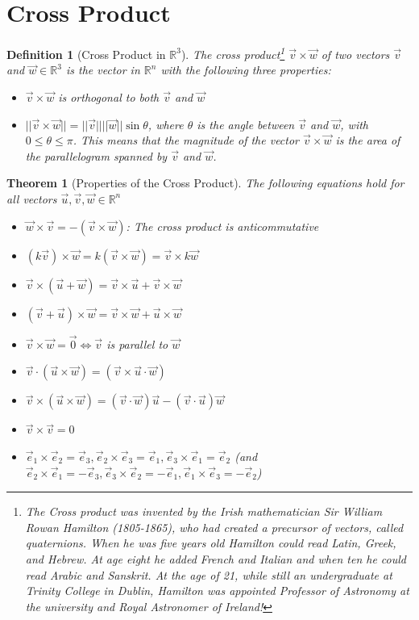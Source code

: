 \documentclass[10pt]{report}
\newtheorem{thm2}{Theorem}[section]
\newtheorem{def2}{Definition}[section]
\begin{document}
\section{Cross Product}
\begin{def2}[Cross Product in $\mathbb{R}^3$]
The cross product\footnote{The Cross product was invented by the Irish mathematician Sir William Rowan Hamilton (1805-1865), who had created a precursor of vectors, called quaternions. When he was five years old Hamilton could read Latin, Greek, and Hebrew. At age eight he added French and Italian and when ten he could read Arabic and Sanskrit. At the age of 21, while still an undergraduate at Trinity College in Dublin, Hamilton was appointed Professor of Astronomy at the university and Royal Astronomer of Ireland!} $\vec{v} \times \vec{w}$ of two vectors $\vec{v}$ and $\vec{w}\in \mathbb{R}^3$ is the vector in $\mathbb{R}^n$ with the following three properties:
\begin{itemize}
\item $\vec{v} \times \vec{w}$ is orthogonal to both $\vec{v}$ and $\vec{w}$
\item $||\vec{v}\times \vec{w}||= ||\vec{v}||||\vec{w}||\sin\theta$, where $\theta$ is the angle between $\vec{v}$ and $\vec{w}$, with $0\leq \theta \leq \pi$. This means that the magnitude of the vector $\vec{v}\times \vec{w}$ is the area of the parallelogram spanned by $\vec{v}$ and $\vec{w}$.
\end{itemize}
\end{def2}
\begin{thm2}[Properties of the Cross Product]
The following equations hold for all vectors $\vec{u}, \vec{v}, \vec{w}\in \mathbb{R}^n$
\begin{itemize}
\item[a.] $\vec{w}\times \vec{v} = -(\vec{v} \times \vec{w})$: The cross product is anticommutative
\item[b.] $(k\vec{v}) \times \vec{w} = k(\vec{v} \times \vec{w}) = \vec{v} \times k\vec{w}$
\item[c.] $\vec{v}\times (\vec{u} +\vec{w})=\vec{v}\times\vec{u}+ \vec{v} \times \vec{w}$
\item[d.] $(\vec{v} + \vec{u}) \times\vec{w}=\vec{v}\times\vec{w}+ \vec{u} \times \vec{w}$
\item[e.] $\vec{v} \times \vec{w} = \vec{0}\iff \vec{v}$ is parallel to $\vec{w}$ 
\item[f.] $\vec{v}\cdot (\vec{u}\times\vec{w})=(\vec{v}\times\vec{u} \cdot \vec{w})$
\item[g.] $\vec{v}\times (\vec{u}\times \vec{w}) = (\vec{v}\cdot \vec{w})\vec{u}-(\vec{v}\cdot \vec{u})\vec{w}$
\item[h.] $\vec{v}\times\vec{v}=0$
\item[i.] $\vec{e}_1 \times \vec{e}_2 = \vec{e}_3, \vec{e}_2 \times \vec{e}_3 = \vec{e}_1, \vec{e}_3 \times \vec{e}_1 = \vec{e}_2$ (and $\vec{e}_2 \times \vec{e}_1 = -\vec{e}_3, \vec{e}_3 \times \vec{e}_2 = -\vec{e}_1, \vec{e}_1 \times \vec{e}_3 = -\vec{e}_2$)
\end{itemize}
\end{thm2}
\end{document}
